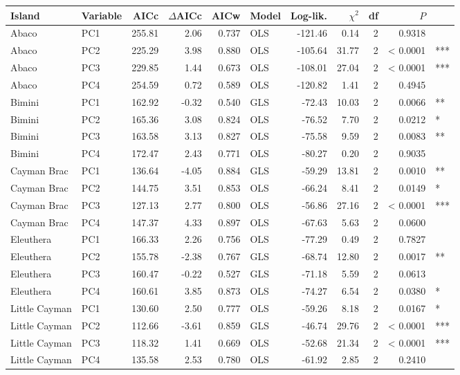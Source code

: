 
\begin{tabular}{llrrrlrrrrl}
\toprule
Island & Variable & AICc & $\Delta$AICc & AICw & Model & Log-lik. & $\chi^2$ & df & $P$ & \\
\midrule
Abaco & PC1 & 255.81 & 2.06 & 0.737 & OLS & -121.46 & 0.14 & 2 & 0.9318 & \\
Abaco & PC2 & 225.29 & 3.98 & 0.880 & OLS & -105.64 & 31.77 & 2 & < 0.0001 & ***\\
Abaco & PC3 & 229.85 & 1.44 & 0.673 & OLS & -108.01 & 27.04 & 2 & < 0.0001 & ***\\
Abaco & PC4 & 254.59 & 0.72 & 0.589 & OLS & -120.82 & 1.41 & 2 & 0.4945 & \\
Bimini & PC1 & 162.92 & -0.32 & 0.540 & GLS & -72.43 & 10.03 & 2 & 0.0066 & **\\
Bimini & PC2 & 165.36 & 3.08 & 0.824 & OLS & -76.52 & 7.70 & 2 & 0.0212 & *\\
Bimini & PC3 & 163.58 & 3.13 & 0.827 & OLS & -75.58 & 9.59 & 2 & 0.0083 & **\\
Bimini & PC4 & 172.47 & 2.43 & 0.771 & OLS & -80.27 & 0.20 & 2 & 0.9035 & \\
Cayman Brac & PC1 & 136.64 & -4.05 & 0.884 & GLS & -59.29 & 13.81 & 2 & 0.0010 & **\\
Cayman Brac & PC2 & 144.75 & 3.51 & 0.853 & OLS & -66.24 & 8.41 & 2 & 0.0149 & *\\
Cayman Brac & PC3 & 127.13 & 2.77 & 0.800 & OLS & -56.86 & 27.16 & 2 & < 0.0001 & ***\\
Cayman Brac & PC4 & 147.37 & 4.33 & 0.897 & OLS & -67.63 & 5.63 & 2 & 0.0600 & \\
Eleuthera & PC1 & 166.33 & 2.26 & 0.756 & OLS & -77.29 & 0.49 & 2 & 0.7827 & \\
Eleuthera & PC2 & 155.78 & -2.38 & 0.767 & GLS & -68.74 & 12.80 & 2 & 0.0017 & **\\
Eleuthera & PC3 & 160.47 & -0.22 & 0.527 & GLS & -71.18 & 5.59 & 2 & 0.0613 & \\
Eleuthera & PC4 & 160.61 & 3.85 & 0.873 & OLS & -74.27 & 6.54 & 2 & 0.0380 & *\\
Little Cayman & PC1 & 130.60 & 2.50 & 0.777 & OLS & -59.26 & 8.18 & 2 & 0.0167 & *\\
Little Cayman & PC2 & 112.66 & -3.61 & 0.859 & GLS & -46.74 & 29.76 & 2 & < 0.0001 & ***\\
Little Cayman & PC3 & 118.32 & 1.41 & 0.669 & OLS & -52.68 & 21.34 & 2 & < 0.0001 & ***\\
Little Cayman & PC4 & 135.58 & 2.53 & 0.780 & OLS & -61.92 & 2.85 & 2 & 0.2410 & \\

\end{tabular}
